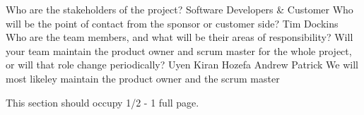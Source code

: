 Who are the stakeholders of the project? 
Software Developers & Customer
Who will be the point of contact from the sponsor or customer side? 
Tim Dockins
Who are the team members, and what will be their areas of responsibility? Will your team maintain the product owner and scrum master for the whole project, or will that role change periodically?
Uyen 
Kiran
Hozefa
Andrew
Patrick
We will most likeley maintain the product owner and the scrum master

This section should occupy 1/2 - 1 full page.